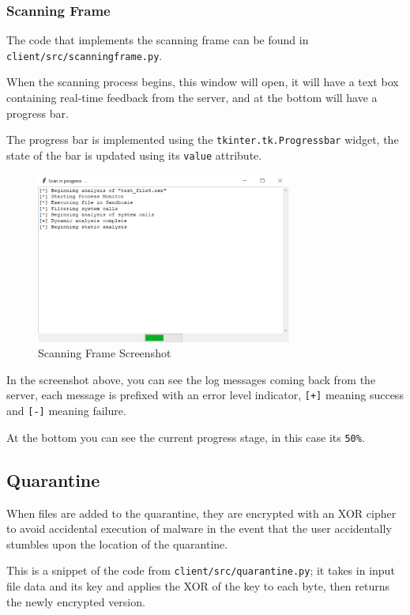 \subsubsection{Scanning Frame}
The code that implements the scanning frame can
be found in \texttt{client/src/scanningframe.py}.

When the scanning process begins, this window will open,
it will have a text box containing real-time feedback from the server,
and at the bottom will have a progress bar.

The progress bar is implemented using the \texttt{tkinter.tk.Progressbar} widget,
the state of the bar is updated using its \texttt{value} attribute. 

\begin{figure}[h!]
    \centering
    \label{image:scanningFrameScreenshot}
    \includegraphics[width=0.75\textwidth]{images/screenshots/scanning_frame}
    \caption{Scanning Frame Screenshot}
\end{figure}

In the screenshot above, you can see the log messages coming back from the server,
each message is prefixed with an error level indicator, \texttt{[+]} meaning success
and \texttt{[-]} meaning failure.

At the bottom you can see the current progress stage, in this case its \texttt{50\%}.

\subsection{Quarantine}
When files are added to the quarantine,
they are encrypted with an XOR cipher to avoid accidental
execution of malware in the event that the user
accidentally stumbles upon the location of the quarantine.

This is a snippet of the code from \texttt{client/src/quarantine.py};
it takes in input file data and its key and applies the XOR of the key to each byte,
then returns the newly encrypted version.

